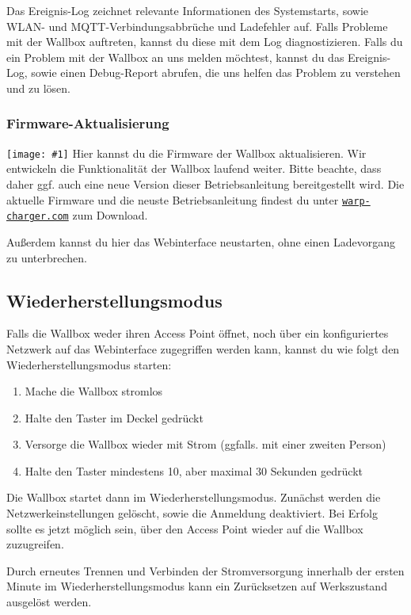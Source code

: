 \documentclass[a4paper,10pt]{article}
\newcommand{\gfx}[1]{\texttt{[image: \#1]}}
\newcommand\rurl[2]{%
  \href{#1}{\nolinkurl{#2}}%
}
\begin{document}
\begin{multicols*}{2}
	\newpage

	Das Ereignis-Log zeichnet relevante Informationen des Systemstarts, sowie WLAN- und MQTT-Verbindungsabbrüche und Ladefehler auf.
	Falls Probleme mit der Wallbox auftreten, kannst du diese mit dem Log diagnostizieren.
	Falls du ein Problem mit der Wallbox an uns melden möchtest, kannst du das Ereignis-Log,
	sowie einen Debug-Report abrufen, die uns helfen das Problem zu verstehen und zu lösen.

	\subsubsection{Firmware-Aktualisierung}\label{firmware-update}
	\gfx{./img_warp2/resized/web_firmware_update}
	Hier kannst du die Firmware der Wallbox aktualisieren. Wir entwickeln die Funktionalität
	der Wallbox laufend weiter. Bitte beachte, dass daher ggf. auch eine neue
	Version dieser Betriebsanleitung bereitgestellt wird.
	Die aktuelle Firmware und die neuste Betriebsanleitung findest du unter
	\rurl{https://warp-charger.com}{warp-charger.com} zum Download.

	Außerdem kannst du hier das Webinterface neustarten, ohne einen Ladevorgang zu unterbrechen.

	\subsection{Wiederherstellungsmodus}\label{recovery}
	Falls die Wallbox weder ihren Access Point öffnet, noch über ein konfiguriertes Netzwerk auf das Webinterface zugegriffen werden kann,
	kannst du wie folgt den Wiederherstellungsmodus starten:
	\begin{enumerate}
	 \item Mache die Wallbox stromlos
	 \item Halte den Taster im Deckel gedrückt
	 \item Versorge die Wallbox wieder mit Strom (ggfalls. mit einer zweiten Person)
	 \item Halte den Taster mindestens 10, aber maximal 30 Sekunden gedrückt
	\end{enumerate}
	Die Wallbox startet dann im Wiederherstellungsmodus. Zunächst werden die Netzwerkeinstellungen gelöscht, sowie die Anmeldung deaktiviert.
	Bei Erfolg sollte es jetzt möglich sein, über den Access Point wieder auf die Wallbox zuzugreifen.

	Durch erneutes Trennen und Verbinden der Stromversorgung innerhalb der ersten Minute im Wiederherstellungsmodus kann ein Zurücksetzen auf Werkszustand ausgelöst werden.


\end{multicols*}
\end{document}
